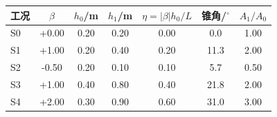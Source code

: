 \begin{tabular}{@{}lS[table-format=+1.2]S[table-format=1.2]S[table-format=1.2]S[table-format=1.2]S[table-format=2.1]S[table-format=1.2]@{}}
\toprule
工况 & {$\beta$} & {$h_0$/m} & {$h_1$/m} & {$\eta=|\beta|h_0/L$} & {锥角/$^\circ$} & {$A_1/A_0$} \\
\midrule
S0 & +0.00 & 0.20 & 0.20 & 0.00 & 0.0 & 1.00 \\
S1 & +1.00 & 0.20 & 0.40 & 0.20 & 11.3 & 2.00 \\
S2 & -0.50 & 0.20 & 0.10 & 0.10 & 5.7 & 0.50 \\
S3 & +1.00 & 0.40 & 0.80 & 0.40 & 21.8 & 2.00 \\
S4 & +2.00 & 0.30 & 0.90 & 0.60 & 31.0 & 3.00 \\
\bottomrule
\end{tabular}
